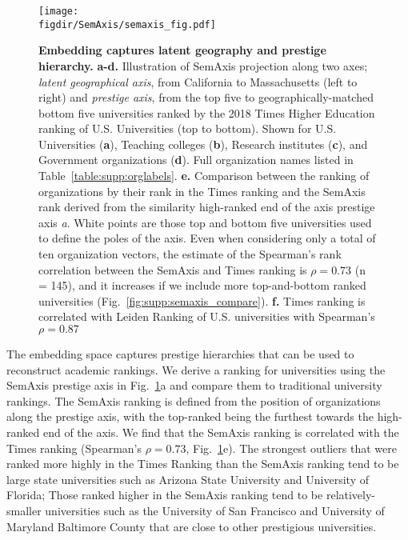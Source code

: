 \documentclass[12pt]{article} %
\def\figdir{../Figs}
\begin{document}
%
%
\begin{figure}[hp!]
	\centering
	\texttt{[image: \\figdir/SemAxis/semaxis\_fig.pdf]}
	\caption{
		\textbf{Embedding captures latent geography and prestige hierarchy.}
		\textbf{a-d.} Illustration of SemAxis projection along two axes;  \textit{latent geographical axis}, from California to Massachusetts (left to right) and \textit{prestige axis}, from the top five to geographically-matched bottom five universities ranked by the 2018 Times Higher Education ranking of U.S. Universities (top to bottom).
		Shown for U.S. Universities (\textbf{a}), Teaching colleges (\textbf{b}), Research institutes (\textbf{c}), and Government organizations (\textbf{d}).
		Full organization names listed in Table~\ref{table:supp:orglabels}.
		\textbf{e.} Comparison between the ranking of organizations by their rank in the Times ranking and the SemAxis rank derived from the similarity high-ranked end of the axis prestige axis \textit{a}.
		White points are those top and bottom five universities used to define the poles of the axis.
	  	Even when considering only a total of ten organization vectors, the estimate of the Spearman's rank correlation between the SemAxis and Times ranking is $\rho = 0.73$ (n = 145), and it increases if we include more top-and-bottom ranked universities (Fig.~\ref{fig:supp:semaxis_compare}).
	  	\textbf{f.} Times ranking is correlated with Leiden Ranking of U.S. universities with Spearman's $\rho = 0.87$
	}
	\label{fig:semaxis}
\end{figure}

The embedding space captures prestige hierarchies that can be used to reconstruct academic rankings. 
We derive a ranking for universities using the SemAxis prestige axis in Fig.~\ref{fig:semaxis}a and compare them to traditional university rankings.
The SemAxis ranking is defined from the position of organizations along the prestige axis, with the top-ranked being the furthest towards the high-ranked end of the axis.
We find that the SemAxis ranking is correlated with the Times ranking (Spearman's $\rho = 0.73$, Fig.~\ref{fig:semaxis}e).
The strongest outliers that were ranked more highly in the Times Ranking than the SemAxis ranking tend to be large state universities such as Arizona State University and  University of Florida;
Those ranked higher in the SemAxis ranking tend to be relatively-smaller universities such as the University of San Francisco and University of Maryland Baltimore County that are close to other prestigious universities.
\end{document}
